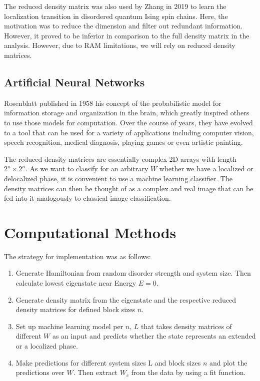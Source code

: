 \documentclass[reprint,amsmath,amssymb,aps,prb]{revtex4-2}
\begin{document}
The reduced density matrix was also used by Zhang in 2019 to learn the localization transition in disordered quantum Ising spin chains. Here, the motivation was to reduce the dimension and filter out redundant information. However, it proved to be inferior in comparison to the full density matrix in the analysis. \cite{Zhang2019} However, due to RAM limitations, we will rely on reduced density matrices.


\subsection{Artificial Neural Networks}

Rosenblatt published in 1958 his concept of the probabilistic model for information storage and organization in the brain, which greatly inspired others to use those models for computation.\cite{Rosenblatt1958} Over the course of years, they have evolved to a tool that can be used for a variety of applications including computer vision, speech recognition, medical diagnosis, playing games or even artistic painting.\cite{Gatys2015}

The reduced density matrices are essentially complex 2D arrays with length $2^n\times2^n$. As we want to classify for an arbitrary $W$ whether we have a localized or delocalized phase, it is convenient to use a machine learning classifier. The density matrices can then be thought of as a complex and real image that can be fed into it analogously to classical image classification.%


\section{Computational Methods}

The strategy for implementation was as follows:

\begin{enumerate}
	\item Generate Hamiltonian from random disorder strength and system size. Then calculate lowest eigenstate near Energy $E = 0$.
	\item Generate density matrix from the eigenstate and the respective reduced density matrices for defined block sizes $n$.
	\item  Set up machine learning model per $n$, $L$ that takes density matrices of different $W$ as an input and predicts whether the state represents an extended or a localized phase.
	\item Make predictions for different system sizes L and block sizes $n$ and plot the predictions over $W$. Then extract $W_c$	from the data by using a fit function.
\end{enumerate}
\end{document}
